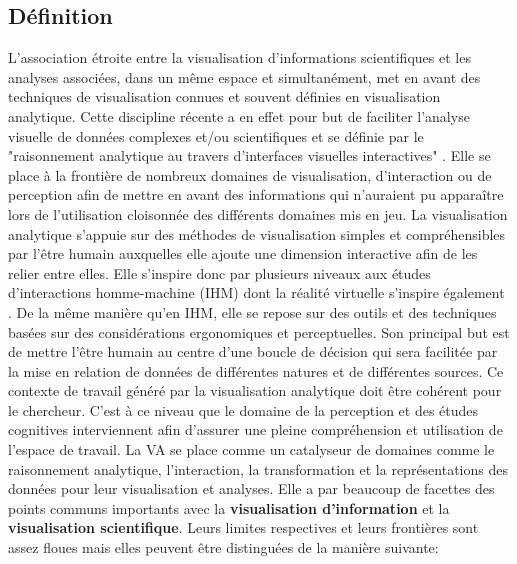 
\subsection{Définition}

L'association étroite entre la visualisation d'informations scientifiques et les analyses associées, dans un même espace et simultanément, met en avant des techniques de visualisation connues et souvent définies en visualisation analytique. Cette discipline récente a en effet pour but de faciliter l'analyse visuelle de données complexes et/ou scientifiques et se définie par le "raisonnement analytique au travers d'interfaces visuelles interactives" \cite{cook_illuminating_2005}. Elle se place à la frontière de nombreux domaines de visualisation, d'interaction ou de perception afin de mettre en avant des informations qui n'auraient pu apparaître lors de l'utilisation cloisonnée des différents domaines mis en jeu. La visualisation analytique s'appuie sur des méthodes de visualisation simples et compréhensibles par l'être humain auxquelles elle ajoute une dimension interactive afin de les relier entre elles. Elle s'inspire donc par plusieurs niveaux aux études d'interactions homme-machine (IHM) dont la réalité virtuelle s'inspire également \cite{arias-hernandez_visual_2011}. De la même manière qu'en IHM, elle se repose sur des outils et des techniques basées sur des considérations ergonomiques et perceptuelles. Son principal but est de mettre l'être humain au centre d'une boucle de décision qui sera facilitée par la mise en relation de données de différentes natures et de différentes sources. Ce contexte de travail généré par la visualisation analytique doit être cohérent pour le chercheur. C'est à ce niveau que le domaine de la perception et des études cognitives interviennent afin d'assurer une pleine compréhension et utilisation de l'espace de travail. La VA se place comme un catalyseur de domaines comme le raisonnement analytique, l'interaction, la transformation et la représentations des données pour leur visualisation et analyses.
Elle a par beaucoup de facettes des points communs importants avec la \textbf{visualisation d'information} et la \textbf{visualisation scientifique}. Leurs limites respectives et leurs frontières sont assez floues mais elles peuvent être distinguées de la manière suivante:

